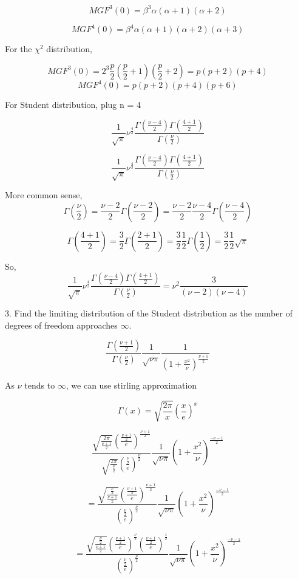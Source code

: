 \documentclass{article}
\begin{document}
$$MGF^{3}(0) = \beta^3 \alpha ({\alpha+1})({\alpha+2}) $$

$$MGF^{4}(0) =  \beta^4 \alpha ({\alpha+1})({\alpha+2})({\alpha+3}) $$

For the $\chi^2$ distribution,

$$MGF^{3}(0) = 2^3 \frac{p}{2} ({\frac{p}{2}+1})({\frac{p}{2}+2}) = p(p+2)(p+4) $$
$$MGF^{4}(0) = p(p+2)(p+4)(p+6) $$

For Student distribution, plug n = 4

$$  \frac{1}{\sqrt{ \pi}} \nu^{\frac{4}{2}} \frac{\Gamma(\frac{\nu-4}{2})\Gamma(\frac{4+1}{2})}{\Gamma(\frac{\nu}{2})}$$

$$  \frac{1}{\sqrt{ \pi}} \nu^{\frac{4}{2}} \frac{\Gamma(\frac{\nu-4}{2})\Gamma(\frac{4+1}{2})}{\Gamma(\frac{\nu}{2})}$$

More common sense, 
$$\Gamma(\frac{\nu}{2}) = \frac{\nu-2}{2} \Gamma(\frac{\nu-2}{2}) =  \frac{\nu-2}{2} \frac{\nu-4}{2} \Gamma(\frac{\nu-4}{2}) $$

$$\Gamma(\frac{4+1}{2}) = \frac{3}{2}\Gamma(\frac{2+1}{2}) = \frac{3}{2} \frac{1}{2}\Gamma(\frac{1}{2}) = \frac{3}{2} \frac{1}{2} \sqrt{\pi}$$

So, 
$$  \frac{1}{\sqrt{ \pi}} \nu^{\frac{4}{2}} \frac{\Gamma(\frac{\nu-4}{2})\Gamma(\frac{4+1}{2})}{\Gamma(\frac{\nu}{2})} =\nu^{2} \frac{ 3 }{{(\nu-2)} {(\nu-4)}} $$


3. Find the limiting distribution of the Student distribution as the number of degrees of freedom approaches $\infty$.


$$\frac{\Gamma(\frac{\nu+1}{2})}{\Gamma(\frac{\nu}{2})} \frac{1}{\sqrt{\nu \pi}} \frac{1}{(1+\frac{x^2}{\nu})^{\frac{\nu+1}{2}}}$$

As $\nu$ tends to $\infty$, we can use stirling approximation 

$$\Gamma(x) = \sqrt{\frac{2\pi}{x}}(\frac{x}{e})^{x}$$

$$\frac{\sqrt{\frac{2\pi}{\frac{\nu+1}{2}}}(\frac{\frac{\nu+1}{2}}{e})^{\frac{\nu+1}{2}}}{\sqrt{\frac{2\pi}{\frac{\nu}{2}}}(\frac{\frac{\nu}{2}}{e})^{\frac{\nu}{2}}} \frac{1}{\sqrt{\nu \pi}} {(1+\frac{x^2}{\nu})^{\frac{-\nu-1}{2}}} $$

$$=\frac{\sqrt{\frac{{\frac{\nu}{2}}}{\frac{\nu+1}{2}}}(\frac{\frac{\nu+1}{2}}{e})^{\frac{\nu+1}{2}}}{(\frac{\frac{\nu}{2}}{e})^{\frac{\nu}{2}}} \frac{1}{\sqrt{\nu \pi}} {(1+\frac{x^2}{\nu})^{\frac{-\nu-1}{2}}} $$

$$=\frac{\sqrt{\frac{{\frac{\nu}{2}}}{\frac{\nu+1}{2}}}(\frac{\frac{\nu+1}{2}}{e})^{\frac{\nu}{2}} (\frac{\frac{\nu+1}{2}}{e})^{\frac{1}{2}} }{(\frac{\frac{\nu}{2}}{e})^{\frac{\nu}{2}}} \frac{1}{\sqrt{\nu \pi}} {(1+\frac{x^2}{\nu})^{\frac{-\nu-1}{2}}} $$
\end{document}
